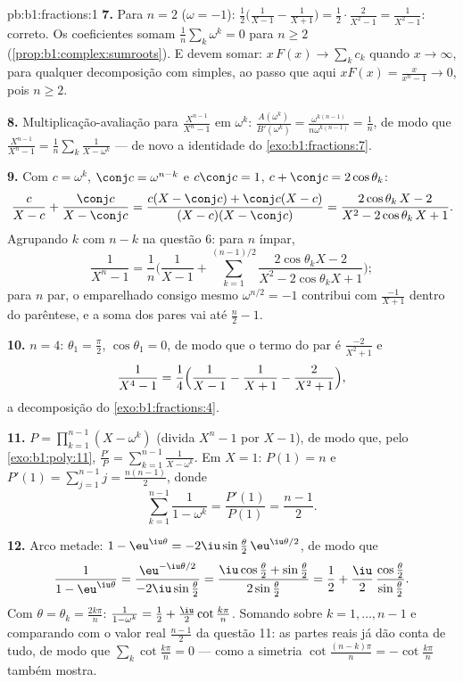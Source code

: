 \begin{solution}{pb:b1:fractions:1}
\textbf{7.} Para $n = 2$ ($\omega = -1$): $\frac12\bigl(
\frac1{X-1} - \frac1{X+1}\bigr) = \frac12\cdot\frac{2}{X^2-1} =
\frac1{X^2-1}$: correto. Os coeficientes somam
$\frac1n\sum_k\omega^k = 0$ para $n \geq 2$
(\cref{prop:b1:complex:sumroots}). E devem somar: $x\,F(x) \to
\sum_k c_k$ quando $x \to \infty$, para qualquer decomposição com 
simples, ao passo que aqui $xF(x) = \frac{x}{x^n-1} \to 0$, pois $n \geq
2$.

\textbf{8.} Multiplicação-avaliação para $\frac{X^{n-1}}{X^n - 1}$ em $\omega^k$:
$\frac{A(\omega^k)}{B'(\omega^k)} =
\frac{\omega^{k(n-1)}}{n\omega^{k(n-1)}} = \frac1n$, de modo que
$\frac{X^{n-1}}{X^n-1} = \frac1n\sum_k\frac1{X - \omega^k}$ ---
de novo a identidade do \cref{exo:b1:fractions:7}.

\textbf{9.} Com $c = \omega^k$, $\conj c = \omega^{n-k}$ e
$c\conj c = 1$, $c + \conj c = 2\cos\theta_k$:
\[
\frac{c}{X - c} + \frac{\conj c}{X - \conj c}
= \frac{c(X - \conj c) + \conj c(X - c)}
{(X - c)(X - \conj c)}
= \frac{2\cos\theta_k\,X - 2}{X^2 - 2\cos\theta_k\,X + 1} .
\]
Agrupando $k$ com $n - k$ na questão 6: para $n$ ímpar,
\[
\frac1{X^n - 1} = \frac1n\Biggl(\frac1{X-1} +
\sum_{k=1}^{(n-1)/2}
\frac{2\cos\theta_k X - 2}{X^2 - 2\cos\theta_k X + 1}\Biggr) ;
\]
para $n$ par, o  emparelhado consigo mesmo $\omega^{n/2} = -1$
contribui com $\frac{-1}{X+1}$ dentro do parêntese, e a soma dos
pares vai até $\frac n2 - 1$.

\textbf{10.} $n = 4$: $\theta_1 = \frac\pi2$, $\cos\theta_1 = 0$,
de modo que o termo do par é $\frac{-2}{X^2+1}$ e
\[
\frac1{X^4-1} = \frac14\Bigl(\frac1{X-1} - \frac1{X+1}
- \frac2{X^2+1}\Bigr) ,
\]
a decomposição do \cref{exo:b1:fractions:4}.

\textbf{11.} $P = \prod_{k=1}^{n-1}(X - \omega^k)$ (divida $X^n -
1$ por $X - 1$), de modo que, pelo \cref{exo:b1:poly:11}, $\frac{P'}P =
\sum_{k=1}^{n-1}\frac1{X-\omega^k}$. Em $X = 1$: $P(1) = n$ e
$P'(1) = \sum_{j=1}^{n-1}j = \frac{n(n-1)}2$, donde
\[
\sum_{k=1}^{n-1}\frac1{1 - \omega^k}
= \frac{P'(1)}{P(1)} = \frac{n-1}2 .
\]

\textbf{12.} Arco metade: $1 - \eu^{\iu\theta} =
-2\iu\sin\frac\theta2\,\eu^{\iu\theta/2}$, de modo que
\[
\frac1{1 - \eu^{\iu\theta}}
= \frac{\eu^{-\iu\theta/2}}{-2\iu\sin\frac\theta2}
= \frac{\iu\cos\frac\theta2 + \sin\frac\theta2}
{2\sin\frac\theta2}
= \frac12 + \frac\iu2\,
\frac{\cos\frac\theta2}{\sin\frac\theta2} .
\]
Com $\theta = \theta_k = \frac{2k\pi}n$: $\frac1{1-\omega^k} =
\frac12 + \frac\iu2\cot\frac{k\pi}n$. Somando sobre $k = 1, \dots,
n-1$
e comparando com o valor real $\frac{n-1}2$ da
questão 11: as partes reais já dão conta de tudo, de modo que
$\sum_k\cot\frac{k\pi}n = 0$ --- como a simetria $\cot\frac{(n-k)
\pi}n = -\cot\frac{k\pi}n$ também mostra.


\end{solution}

